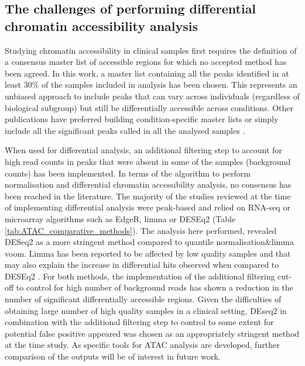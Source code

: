\subsection{The challenges of performing differential chromatin accessibility analysis}
Studying chromatin accessibility in clinical samples first requires the definition of a consensus master list of accessible regions for which no accepted method has been agreed. In this work, a master list containing all the peaks identified in at least 30\% of the samples included in analysis has been chosen. This represents an unbiased approach to include peaks that can vary across individuals (regardless of biological subgroup) but still be differentially accessible across conditions. Other publications have preferred building condition-specific master lists or simply include all the significant peaks called in all the analysed samples \parencite{Alasoo2018, Thurner2018}. 

When used for differential analysis, an additional filtering step to account for high read counts in peaks that were absent in some of the samples (background counts) has been implemented. In terms of the algorithm to perform normalisation and differential chromatin accessibility analysis, no consensus has been reached in the literature. The majority of the studies reviewed at the time of implementing differential analysis were peak-based and relied on RNA-seq or microarray algorithms such as EdgeR, limma or DESEq2 (Table \ref{tab:ATAC_comparative_methods}). The analysis here performed, revealed DESeq2 as a more stringent method compared to quantile normalisation\&limma voom. Limma has been reported to be affected by low quality samples and that may also explain the increase in differential hits observed when compared to DESEq2 \parencite{Alasoo2018}. For both methods, the implementation of the additional filtering cut-off to control for high number of background reads has shown a reduction in the number of significant differentially accessible regions. Given the difficulties of obtaining large number of high quality samples in a clinical setting, DEseq2 in combination with the additional filtering step to control to some extent for potential false positive appeared was chosen as an appropriately stringent method at the time study. As specific tools for ATAC analysis are developed, further comparison of the outputs will be of interest in future work.


